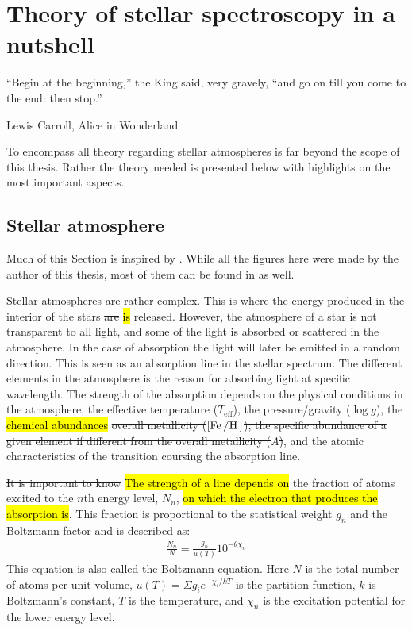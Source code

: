 \chapter{Theory of stellar spectroscopy in a nutshell}
\label{cha:theory}

\epigraph{``Begin at the beginning,'' the King said, very gravely, ``and go on till you come to the
          end: then stop.''}{Lewis Carroll, Alice in Wonderland}

To encompass all theory regarding stellar atmospheres is far beyond the scope of this thesis. Rather
the theory needed is presented below with highlights on the most important aspects.


\section{Stellar atmosphere}
\label{sec:stellar_atmosphere}

Much of this Section is inspired by \citet{Gray2006}. While all the figures here were made by the
author of this thesis, most of them can be found in \citet{Gray2006} as well.

Stellar atmospheres are rather complex. This is where the energy produced in the interior of the
stars \st{are} \hl{is} released. However, the atmosphere of a star is not transparent to all light,
and some of the light is absorbed or scattered in the atmosphere. In the case of absorption the
light will later be emitted in a random direction. This is seen as an absorption line in the stellar
spectrum. The different elements in the atmosphere is the reason for absorbing light at specific
wavelength. The strength of the absorption depends on the physical conditions in the atmosphere, the
effective temperature ($T_\mathrm{eff}$), the pressure/gravity ($\log g$), the \hl{chemical
abundances} \st{overall metallicity ($[\ion{Fe}/\ion{H}]$), the specific abundance of a given
element if different from the overall metallicity ($A$)}, and the atomic characteristics of the
transition coursing the absorption line.

\st{It is important to know} \hl{The strength of a line depends on} the fraction of atoms excited to
the $n$th energy level, $N_n$, \hl{on which the electron that produces the absorption is}. This
fraction is proportional to the statistical weight $g_n$ and the Boltzmann factor and is described
as:
\begin{align}
    \frac{N_n}{N} = \frac{g_n}{u(T)} 10^{-\theta\chi_n} \tag*{Boltzmann}\label{eq:boltzmann}
\end{align}
This equation is also called the Boltzmann equation. Here $N$ is the total number of atoms per unit
volume, $u(T)=\Sigma g_i e^{-\chi_i/kT}$ is the partition function, $k$ is Boltzmann's constant, $T$
is the temperature, and $\chi_n$ is the excitation potential for the lower energy level.

